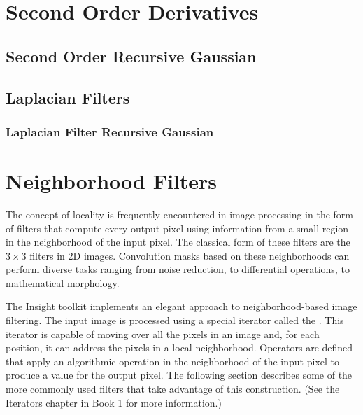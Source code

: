 \section{Second Order Derivatives}
\label{sec:SecondOrderDerivatives}


\subsection{Second Order Recursive Gaussian}
\label{sec:SecondDerivativeRecursiveGaussian}



\subsection{Laplacian Filters}
\label{sec:LaplacianFilters}

\subsubsection{Laplacian Filter Recursive Gaussian}





\section{Neighborhood Filters}
\label{sec:NeighborhoodFilters}

The concept of locality is frequently encountered in image processing in the
form of filters that compute every output pixel using information from a small
region in the neighborhood of the input pixel.  The classical form of
these filters are the $3 \times 3$ filters in 2D images. Convolution masks
based on these neighborhoods can perform diverse tasks ranging from noise
reduction, to differential operations, to mathematical morphology.

The Insight toolkit implements an elegant approach to neighborhood-based image
filtering.  The input image is processed using a special iterator called the
. This iterator is capable of moving over all the
pixels in an image and, for each position, it can address the pixels in a local
neighborhood. Operators are defined that apply an algorithmic operation in the
neighborhood of the input pixel to produce a value for the output pixel.  The
following section describes some of the more commonly used filters that take
advantage of this construction. (See the Iterators chapter
in Book 1 for more information.)

